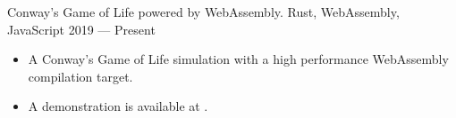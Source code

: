 \showoff
{}
{Conway's Game of Life powered by WebAssembly.}
{Rust, WebAssembly, JavaScript}
{2019 --- Present}

\begin{itemize}[label=$\triangleright$]
    \item A Conway's Game of Life simulation with a high performance WebAssembly compilation target.
    \item A demonstration is available at .
\end{itemize}
